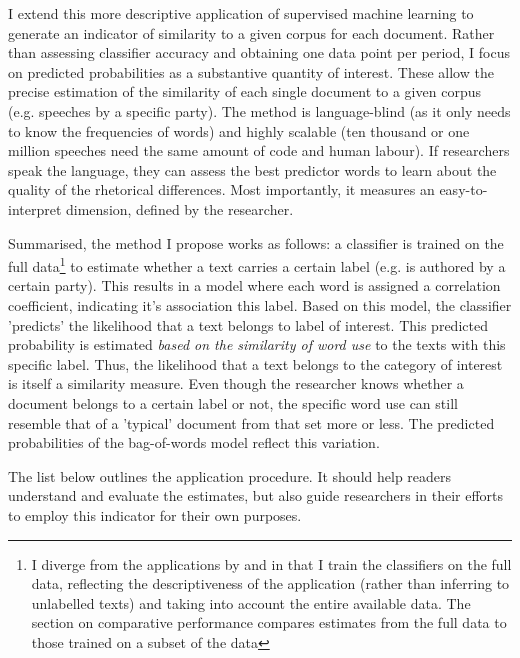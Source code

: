 \documentclass{article}
\begin{document}
I extend this more descriptive application of supervised machine learning to generate an indicator of similarity to a given corpus for each document. Rather than assessing classifier accuracy and obtaining one data point per period, I focus on predicted probabilities as a substantive quantity of interest. These allow the precise estimation of the similarity of each single document to a given corpus (e.g. speeches by a specific party). The method is language-blind (as it only needs to know the frequencies of words) and highly scalable (ten thousand or one million speeches need the same amount of code and human labour). If researchers speak the language, they can assess the best predictor words to learn about the quality of the rhetorical differences. Most importantly, it measures an easy-to-interpret dimension, defined by the researcher. \par

Summarised, the method I propose works as follows: a classifier is trained on the full data\footnote{I diverge from the applications by \cite{Peterson2018} and \cite{Goet2019} in that I train the classifiers on the full data, reflecting the descriptiveness of the application (rather than inferring to unlabelled texts) and taking into account the entire available data. The section on comparative performance compares estimates from the full data to those trained on a subset of the data} to estimate whether a text carries a certain label (e.g. is authored by a certain party). This results in a model where each word is assigned a correlation coefficient, indicating it's association this label. Based on this model, the classifier 'predicts' the likelihood that a text belongs to label of interest. This predicted probability is estimated \textit{based on the similarity of word use} to the texts with this specific label. Thus, the likelihood that a text belongs to the category of interest is itself a similarity measure. Even though the researcher knows whether a document belongs to a certain label or not, the specific word use can still resemble that of a 'typical' document from that set more or less. The predicted probabilities of the bag-of-words model reflect this variation. \par

The list below outlines the application procedure. It should help readers understand and evaluate the estimates, but also guide researchers in their efforts to employ this indicator for their own purposes. \medskip

\end{document}
